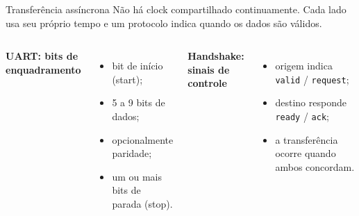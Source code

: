 \begin{frame}{Transferência assíncrona}
  Não há clock compartilhado continuamente. Cada lado usa seu próprio tempo e um protocolo indica quando os dados são válidos.
  \begin{columns}[T]
    \textbf{UART: bits de enquadramento}
    \begin{itemize}
      \item bit de início (start);
      \item 5 a 9 bits de dados;
      \item opcionalmente paridade;
      \item um ou mais bits de parada (stop).
    \end{itemize}
    \textbf{Handshake: sinais de controle}
    \begin{itemize}
      \item origem indica \texttt{valid} / \texttt{request};
      \item destino responde \texttt{ready} / \texttt{ack};
      \item a transferência ocorre quando ambos concordam.
    \end{itemize}
  \end{columns}
\end{frame}